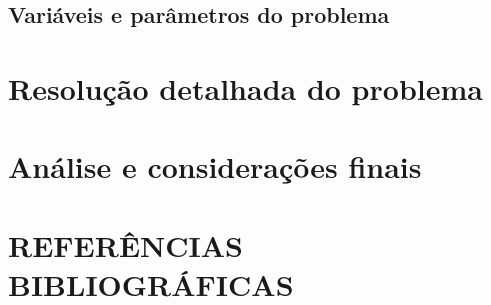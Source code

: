\documentclass[
	article,			%
	11pt,				%
	oneside,			%
	a4paper,			%
	english,			%
	brazil,				%
	sumario=tradicional
	]{abntex2}
\begin{document}
\subsection{Variáveis e parâmetros do problema}

\section{Resolução detalhada do problema}

\section{Análise e considerações finais}

\section{REFERÊNCIAS BIBLIOGRÁFICAS}
\end{document}
